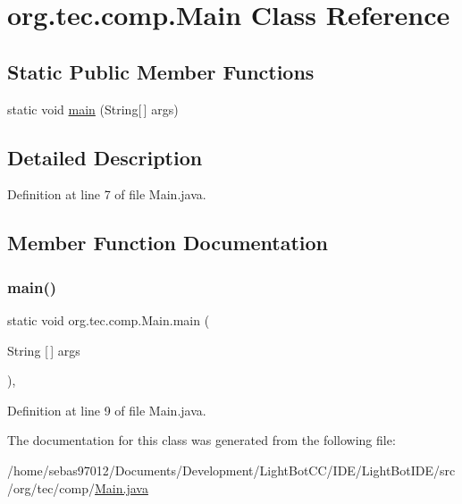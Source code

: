 \hypertarget{classorg_1_1tec_1_1comp_1_1_main}{}\section{org.\+tec.\+comp.\+Main Class Reference}
\label{classorg_1_1tec_1_1comp_1_1_main}
\subsection*{Static Public Member Functions}
\begin{DoxyCompactItemize}
\item 
static void \mbox{\hyperlink{classorg_1_1tec_1_1comp_1_1_main_a0fef068f79016f78a46d23ab52fe9ea8}{main}} (String\mbox{[}$\,$\mbox{]} args)
\end{DoxyCompactItemize}


\subsection{Detailed Description}


Definition at line 7 of file Main.\+java.



\subsection{Member Function Documentation}
\mbox{\label{classorg_1_1tec_1_1comp_1_1_main_a0fef068f79016f78a46d23ab52fe9ea8}} 
\subsubsection{\texorpdfstring{main()}{main()}}
{\footnotesize\ttfamily static void org.\+tec.\+comp.\+Main.\+main (\begin{DoxyParamCaption}\item[{String \mbox{[}$\,$\mbox{]}}]{args }\end{DoxyParamCaption})\hspace{0.3cm}{\ttfamily [inline]}, {\ttfamily [static]}}



Definition at line 9 of file Main.\+java.



The documentation for this class was generated from the following file\+:\begin{DoxyCompactItemize}
\item 
/home/sebas97012/\+Documents/\+Development/\+Light\+Bot\+C\+C/\+I\+D\+E/\+Light\+Bot\+I\+D\+E/src/org/tec/comp/\mbox{\hyperlink{_i_d_e_2_light_bot_i_d_e_2src_2org_2tec_2comp_2_main_8java}{Main.\+java}}\end{DoxyCompactItemize}

